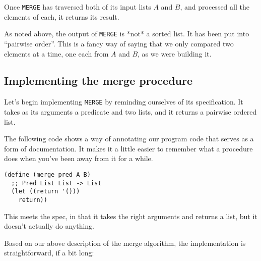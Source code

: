 \documentclass[12pt,openright,draft]{book}
\begin{document}
Once \verb|MERGE| has traversed both of its input lists $A$ and $B$,
and processed all the elements of each, it returns its result.

As noted above, the output of \verb|MERGE| is *not* a sorted list.  It has
been put into ``pairwise order''.  This is a fancy way of saying that we
only compared two elements at a time, one each from $A$ and $B$, as we
were building it.

\subsection{Implementing the merge procedure}

Let's begin implementing \verb|MERGE| by reminding ourselves of its
specification.  It takes as its arguments a predicate and two
lists, and it returns a pairwise ordered list.

The following code shows a way of annotating our program code
that serves as a form of documentation.  It makes it a little
easier to remember what a procedure does when you've been away
from it for a while.

\begin{verbatim}
(define (merge pred A B)
  ;; Pred List List -> List
  (let ((return '()))
    return))
\end{verbatim}

This meets the spec, in that it takes the right arguments and returns
a list, but it doesn't actually do anything.

Based on our above description of the merge algorithm, the
implementation is straightforward, if a bit long:
\end{document}
